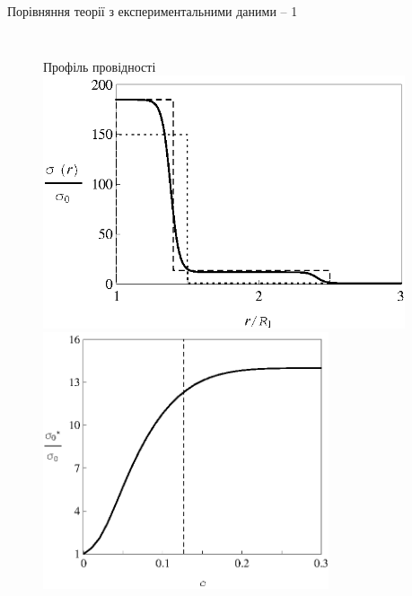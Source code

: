 \documentclass[10pt]{beamer}
\begin{document}
\begin{frame}{Порівняння теорії з експериментальними даними -- 1}
\begin{columns}[T,onlytextwidth]
      \begin{figure}
        \centering
        { \qquad Профіль провідності}
        \includegraphics[width=0.95\textwidth]{images/Fig13_Liang_LiI-Al2O3-Profile.eps}\\
        \includegraphics[width=0.75\textwidth]{images/Fig14_Liang_LiI-Al2O3-Matrix_2.eps}
      \end{figure}
      
\end{columns}

\end{frame}
\end{document}
